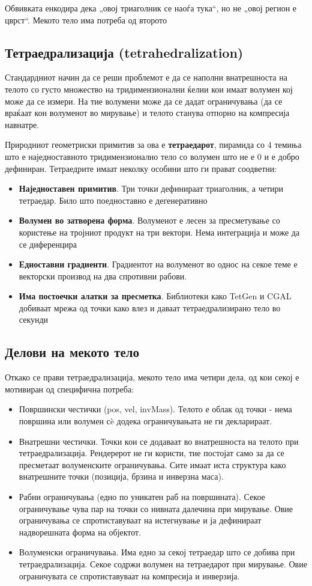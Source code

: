 Обвивката енкодира дека „овој триаголник се наоѓа тука“, но не „овој регион е цврст“. Мекото тело има потреба од второто

\subsection{Тетраедрализација (tetrahedralization)}
Стандардниот начин да се реши проблемот е да се наполни внатрешноста на телото со густо множество на тридимензионални ќелии кои имаат волумен кој може да се измери. На тие волумени може да се дадат ограничувања (да се враќаат кон волуменот во мирување) и телото станува отпорно на компресија навнатре.

Природниот геометриски примитив за ова е \textbf{тетраедарот}, пирамида со 4 темиња што е наједноставното тридимензионално тело со волумен што не е 0 и е добро дефиниран. Тетраедрите имаат неколку особини што ги прават соодветни:
\begin{itemize}
	\item \textbf{Наједноставен примитив}. Три точки дефинираат триаголник, а четири тетраедар. Било што поедноставно е дегенеративно
	\item \textbf{Волумен во затворена форма}. Волуменот е лесен за пресметување со користење на тројниот продукт на три вектори. Нема интеграција и може да се диференцира
	\item \textbf{Едноставни градиенти}. Градиентот на волуменот во однос на секое теме е векторски производ на два спротивни рабови.
	\item \textbf{Има постоечки алатки за пресметка}. Библиотеки како TetGen и CGAL добиваат мрежа од точки како влез и даваат тетраедрализирано тело во секунди
\end{itemize}


\subsection{Делови на мекото тело}
Откако се прави тетраедрализација, мекото тело има четири дела, од кои секој е мотивиран од специфична потреба:

\begin{itemize}
	\item Површински честички (pos, vel, invMass). Телото е облак од точки - нема површина или волумен сè додека ограничувањата не ги декларираат.
	\item Внатрешни честички. Точки кои се додаваат во внатрешноста на телото при тетраедрализација. Рендерерот не ги користи, тие постојат само за да се пресметаат волуменските ограничувања. Сите имаат иста структура како внатрешните точки (позиција, брзина и инверзна маса). 
	\item Рабни ограничувања (едно по уникатен раб на површината). Секое ограничување чува пар на точки со нивната далечина при мирување. Овие ограничувања се спротиставуваат на истегнување и ја дефинираат надворешната форма на објектот.
	\item Волуменски ограничувања. Има едно за секој тетраедар што се добива при тетраедрализација. Секое содржи волумен на тетраедарот при мирување. Овие ограничувата се спротиставуваат на компресија и инверзија.
\end{itemize}

